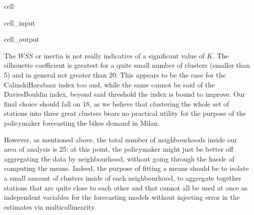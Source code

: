\documentclass[letterpaper,10pt,english]{jupyterBook}
\begin{document}
\begin{sphinxuseclass}{cell}
\begin{sphinxuseclass}{cell_input}
\begin{sphinxVerbatim}[commandchars=\\\{\}]
          

         
          


    

\end{sphinxVerbatim}

\end{sphinxuseclass}
\begin{sphinxuseclass}{cell_output}
\noindent{}

\end{sphinxuseclass}
\end{sphinxuseclass}
\sphinxAtStartPar
The \(WSS\) or inertia is not really indicative of a significant value of \(K\). The silhouette coefficient is greatest for a quite small number of clusters (smaller than 5) and in general not greater than 20. This appears to be the case for the Calinski\sphinxhyphen{}Harabasz index too and, while the same cannot be said of the Davies\sphinxhyphen{}Bouldin index, beyond said threshold the index is bound to improve. Our final choice should fall on 18, as we believe that clustering the whole set of stations into three great clusters bears no practical utility for the purpose of the policymaker \sphinxhyphen{} forecasting the bikes demand in Milan.

\sphinxAtStartPar
However, as mentioned above, the total number of neighbourhoods inside our area of analysis is 25: at this point, the policymaker might just be better off aggregating the data by neighbourhood, without going through the hassle of computing the \sphinxhyphen{}means. Indeed, the purpose of fitting a \sphinxhyphen{}means should be to isolate a small amount of clusters inside of each neighbourhood, to aggregate together stations that are quite close to each other and that cannot all be used at once as independent variables for the forecasting models without injecting error in the estimates via multicollinearity.
\end{document}
